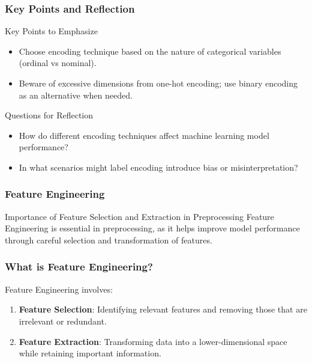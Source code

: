 \documentclass[aspectratio=169]{beamer}
\begin{document}
\begin{frame}[fragile]
    \frametitle{Key Points and Reflection}
    \begin{block}{Key Points to Emphasize}
        \begin{itemize}
            \item Choose encoding technique based on the nature of categorical variables (ordinal vs nominal).
            \item Beware of excessive dimensions from one-hot encoding; use binary encoding as an alternative when needed.
        \end{itemize}
    \end{block}
    
    \begin{block}{Questions for Reflection}
        \begin{itemize}
            \item How do different encoding techniques affect machine learning model performance?
            \item In what scenarios might label encoding introduce bias or misinterpretation?
        \end{itemize}
    \end{block}
\end{frame}

\begin{frame}
    \frametitle{Feature Engineering}
    \begin{block}{Importance of Feature Selection and Extraction in Preprocessing}
        Feature Engineering is essential in preprocessing, as it helps improve model performance through careful selection and transformation of features.
    \end{block}
\end{frame}

\begin{frame}
    \frametitle{What is Feature Engineering?}
    Feature Engineering involves:
    \begin{enumerate}
        \item \textbf{Feature Selection}: Identifying relevant features and removing those that are irrelevant or redundant.
        \item \textbf{Feature Extraction}: Transforming data into a lower-dimensional space while retaining important information.
    \end{enumerate}
\end{frame}
\end{document}
